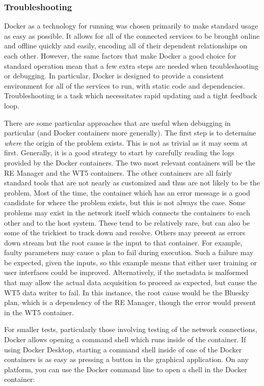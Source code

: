 \subsubsection{Troubleshooting}

Docker as a technology for running \biab was chosen primarily to make standard usage as easy as possible.
It allows for all of the connected services to be brought online and offline quickly and easily, encoding all of their dependent relationships on each other.
However, the same factors that make Docker a good choice for standard operation mean that a few extra steps are needed when troubleshooting or debugging.
In particular, Docker is designed to provide a consistent environment for all of the services to run, with static code and dependencies.
Troubleshooting is a task which necessitates rapid updating and a tight feedback loop.

There are some particular approaches that are useful when debugging \biab in particular (and Docker containers more generally).
The first step is to determine \textit{where} the origin of the problem exists.
This is not as trivial as it may seem at first.
Generally, it is a good strategy to start by carefully reading the logs provided by the Docker containers.
The two most relevant containers will be the RE Manager and the WT5 containers.
The other containers are all fairly standard tools that are not nearly as customized and thus are not likely to be the problem.
Most of the time, the container which has an error message is a good candidate for where the problem exists, but this is not always the case.
Some problems may exist in the network itself which connects the containers to each other and to the host system.
These tend to be relatively rare, but can also be some of the trickiest to track down and resolve.
Others may present as errors down stream but the root cause is the input to that container.
For example, faulty parameters may cause a plan to fail during execution.
Such a failure may be expected, given the inputs, so this example means that either user training or user interfaces could be improved.
Alternatively, if the metadata is malformed that may allow the actual data acquisition to proceed as expected, but cause the WT5 data writer to fail.
In this instance, the root cause would be the Bluesky plan, which is a dependency of the RE Manager, though the error would present in the WT5 container.


For smaller tests, particularly those involving testing of the network connections, Docker allows opening a command shell which runs inside of the container.
If using Docker Desktop, starting a command shell inside of one of the Docker containers is as easy as pressing a button in the graphical application.
On any platform, you can use the Docker command line to open a shell in the Docker container:

